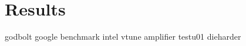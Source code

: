 \documentclass[crop=false]{standalone}
\begin{document}
  \section{Results} %
  \label{sec:results}
    godbolt
    google benchmark
    intel vtune amplifier
    testu01
    dieharder
\end{document}
